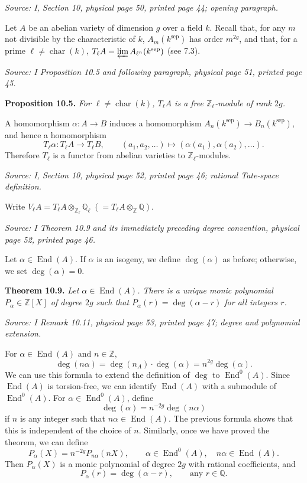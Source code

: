 \documentclass[11pt]{article}
\DeclareMathOperator{\AVEnd}{End}
\newcommand{\AVQ}{\mathbb{Q}}
\newcommand{\AVZ}{\mathbb{Z}}
\newcommand{\AVsrc}[1]{\par\smallskip\noindent\textit{Source: #1.}\par\smallskip}
\begin{document}
\AVsrc{I, Section 10, physical page 50, printed page 44; opening paragraph}
Let $A$ be an abelian variety of dimension $g$ over a field $k$.
Recall that, for any $m$ not divisible by the characteristic of $k$,
$A_m(k^{\mathrm{sep}})$ has order $m^{2g}$, and that, for a prime
$\ell\ne\operatorname{char}(k)$,
$T_\ell A=\varprojlim A_{\ell^n}(k^{\mathrm{sep}})$ (see 7.3).

\AVsrc{I Proposition 10.5 and following paragraph, physical page 51, printed page 45}
\noindent\textbf{Proposition 10.5.}
\emph{For $\ell\ne\operatorname{char}(k)$, $T_\ell A$ is a free
$\AVZ_\ell$-module of rank $2g$.}

A homomorphism $\alpha:A\to B$ induces a homomorphism
$A_n(k^{\mathrm{sep}})\to B_n(k^{\mathrm{sep}})$, and hence a homomorphism
\[
T_\ell\alpha:T_\ell A\longrightarrow T_\ell B,\qquad
(a_1,a_2,\ldots)\longmapsto(\alpha(a_1),\alpha(a_2),\ldots).
\]
Therefore $T_\ell$ is a functor from abelian varieties to $\AVZ_\ell$-modules.

\AVsrc{I, Section 10, physical page 52, printed page 46; rational Tate-space definition}
Write $V_\ell A=T_\ell A\otimes_{\AVZ_\ell}\AVQ_\ell
\;(=T_\ell A\otimes_{\AVZ}\AVQ)$.

\AVsrc{I Theorem 10.9 and its immediately preceding degree convention,
physical page 52, printed page 46}
Let $\alpha\in\AVEnd(A)$. If $\alpha$ is an isogeny, we define
$\deg(\alpha)$ as before; otherwise, we set $\deg(\alpha)=0$.

\noindent\textbf{Theorem 10.9.}
\emph{Let $\alpha\in\AVEnd(A)$. There is a unique monic polynomial
$P_\alpha\in\AVZ[X]$ of degree $2g$ such that
$P_\alpha(r)=\deg(\alpha-r)$ for all integers $r$.}

\AVsrc{I Remark 10.11, physical page 53, printed page 47; degree and polynomial extension}
For $\alpha\in\AVEnd(A)$ and $n\in\AVZ$,
\[
\deg(n\alpha)=\deg(n_A)\cdot\deg(\alpha)=n^{2g}\deg(\alpha).
\]
We can use this formula to extend the definition of $\deg$ to
$\AVEnd^0(A)$. Since $\AVEnd(A)$ is torsion-free, we can identify
$\AVEnd(A)$ with a submodule of $\AVEnd^0(A)$. For
$\alpha\in\AVEnd^0(A)$, define
\[
\deg(\alpha)=n^{-2g}\deg(n\alpha)
\]
if $n$ is any integer such that $n\alpha\in\AVEnd(A)$.
The previous formula shows that this is independent of the choice of $n$.
Similarly, once we have proved the theorem, we can define
\[
P_\alpha(X)=n^{-2g}P_{n\alpha}(nX),\qquad
\alpha\in\AVEnd^0(A),\quad n\alpha\in\AVEnd(A).
\]
Then $P_\alpha(X)$ is a monic polynomial of degree $2g$ with rational
coefficients, and
\[
P_\alpha(r)=\deg(\alpha-r),\qquad\text{any }r\in\AVQ.
\]
\end{document}
